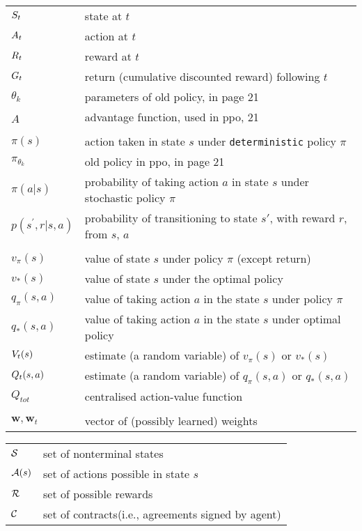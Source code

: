 \begin{tabular}{p{1.6cm} p{12cm}}
$S_t$  & state at $t$ \\
$A_t$  & action at $t$ \\
$R_t$  & reward at $t$ \\
$G_t$  & return (cumulative discounted reward) following $t$ \\
$\theta_{k}$ & parameters of old policy, in page 21 \\
$\hat{A}$ & advantage function, used in ppo, 21\\

\\
$\pi(s)$  & action taken in state $s$ under \texttt{deterministic} policy $\pi$ \\
$\pi_{\theta_{k}}$ & old policy in ppo, in page 21 \\
$\pi(a|s)$  & probability of taking action $a$ in state $s$ under stochastic policy $\pi$ \\
$p(s^{\prime},r|s,a)$  & probability of transitioning to state $s'$, with reward $r$, from $s$, $a$ \\
\\
$v_\pi(s)$ & value of state $s$ under policy $\pi$ (except return) \\
$v_*(s)$ & value of state $s$ under the optimal policy \\
$q_{\pi}(s, a)$ & value of taking action $a$ in the state $s$ under policy $\pi$ \\
$q_{*}(s, a)$ & value of taking action $a$ in the state $s$ under optimal policy \\
$V_{t}(s)$ & estimate (a random variable) of $v_{\pi}(s)$ or $v_{*}(s)$ \\ 
$Q_{t}(s, a)$ & estimate (a random variable) of $q_{\pi}(s, a)$ or $q_{*}(s, a)$ \\
$Q_{tot}$ &  centralised action-value function \\
\\
$\mathbf{w}, \mathbf{w}_{t}$ & vector of (possibly learned) weights \\


\end{tabular}


\begin{tabular}{p{1.5cm} p{12cm}}
$\mathcal{S}$ & set of nonterminal states \\
$\mathcal{A}(s)$ & set of actions possible in state $s$ \\
$\mathcal{R}$ & set of possible rewards \\
$\mathcal{C}$ & set of contracts(i.e., agreements signed by agent) \\
\end{tabular}